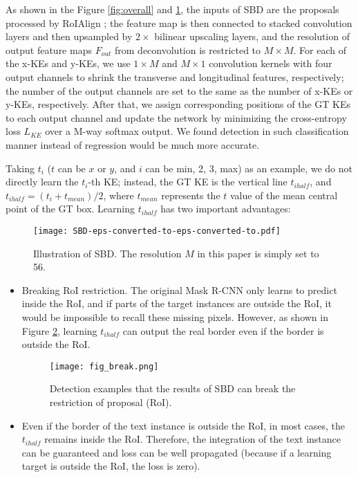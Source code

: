 \documentclass{article}
\begin{document}
As shown in the Figure \ref{fig:overall} and \ref{fig:SBD}, the inputs of SBD are the proposals processed by RoIAlign \cite{he2017mask}; the feature map is then connected to stacked convolution layers and then upsampled by $2\times$ bilinear upscaling layers, and the resolution of output feature maps $F_{out}$ from deconvolution is restricted to $M\times M$. For each of the x-KEs and y-KEs, we use $1\times M$ and $M\times 1$ convolution kernels with four output channels to shrink the transverse and longitudinal features, respectively; the number of the output channels are set to the same as the number of x-KEs or y-KEs, respectively. After that, we assign corresponding positions of the GT KEs to each output channel and update the network by minimizing the cross-entropy loss {$L_{KE}$} over a M-way softmax output. We found detection in such classification manner instead of regression would be much more accurate. 

Taking $t_{i}$ ($t$ can be $x$ or $y$, and $i$ can be min, 2, 3, max) as an example, we do not directly learn the $t_{i}$-th KE; instead, the GT KE is the vertical line $t_{ihalf}$, and $t_{ihalf} = (t_{i} + t_{mean})/2$, where $t_{mean}$ represents the $t$ value of the mean central point of the GT box. Learning $t_{ihalf}$ has two important advantages:
\begin{figure}[!t]
  \centering
  \centerline{\texttt{[image: SBD-eps-converted-to-eps-converted-to.pdf]}}
  \caption{Illustration of SBD. The resolution $M$ in this paper is simply set to 56.}\label{fig:SBD}
\end{figure}
\begin{itemize}
  \item Breaking RoI restriction. The original Mask R-CNN only learns to predict inside the RoI, and if parts of the target instances are outside the RoI, it would be impossible to recall these missing pixels. However, as shown in Figure \ref{fig:break}, learning $t_{ihalf}$ can output the real border even if the border is outside the RoI.
  \begin{figure}[!t]
    \centering
    \centerline{\texttt{[image: fig\_break.png]}}
    \caption{Detection examples that the results of SBD can break the restriction of proposal (RoI).}\label{fig:break}
  \end{figure}
  \item Even if the border of the text instance is outside the RoI, in most cases, the $t_{ihalf}$ remains inside the RoI. Therefore, the integration of the text instance can be guaranteed and loss can be well propagated (because if a learning target is outside the RoI, the loss is zero).
\end{itemize}
\end{document}
